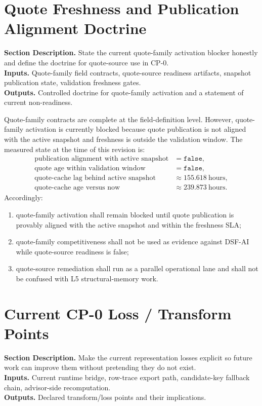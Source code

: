 \documentclass[11pt]{report}
\newcommand{\meta}[3]{\textbf{Section Description.} #1\\
\textbf{Inputs.} #2\\
\textbf{Outputs.} #3\par}
\begin{document}
\section{Quote Freshness and Publication Alignment Doctrine}
\meta{State the current quote-family activation blocker honestly and define the doctrine for quote-source use in CP-0.}{Quote-family field contracts, quote-source readiness artifacts, snapshot publication state, validation freshness gates.}{Controlled doctrine for quote-family activation and a statement of current non-readiness.}

Quote-family contracts are complete at the field-definition level. However, quote-family activation is currently blocked because quote publication is not aligned with the active snapshot and freshness is outside the validation window. The measured state at the time of this revision is:
\begin{align*}
\text{publication alignment with active snapshot} &= \texttt{false},\\
\text{quote age within validation window} &= \texttt{false},\\
\text{quote-cache lag behind active snapshot} &\approx 155.618\ \text{hours},\\
\text{quote-cache age versus now} &\approx 239.873\ \text{hours}.
\end{align*}
Accordingly:
\begin{enumerate}[leftmargin=1.2cm]
    \item quote-family activation shall remain blocked until quote publication is provably aligned with the active snapshot and within the freshness SLA;
    \item quote-family competitiveness shall not be used as evidence against DSF-AI while quote-source readiness is false;
    \item quote-source remediation shall run as a parallel operational lane and shall not be confused with L5 structural-memory work.
\end{enumerate}


\section{Current CP-0 Loss / Transform Points}
\meta{Make the current representation losses explicit so future work can improve them without pretending they do not exist.}{Current runtime bridge, row-trace export path, candidate-key fallback chain, advisor-side recomputation.}{Declared transform/loss points and their implications.}
\end{document}
